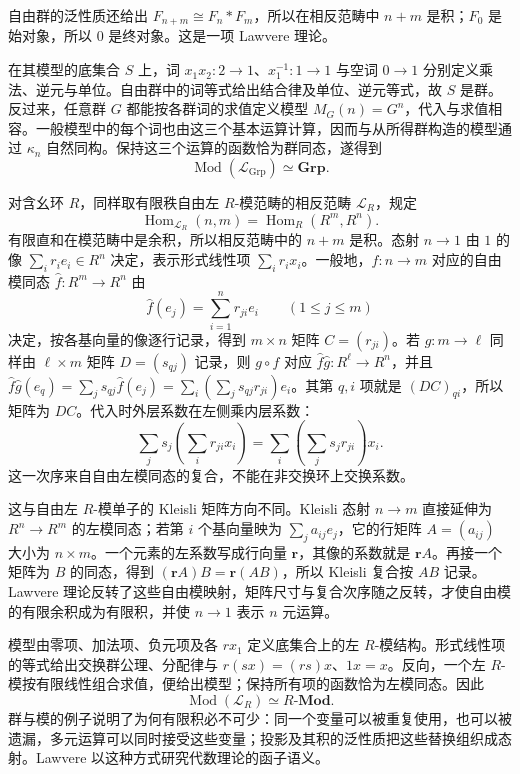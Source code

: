 \ProseParagraphBreak
自由群的泛性质还给出 \(F_{n+m}\cong F_n*F_m\)，所以在相反范畴中 \(n+m\) 是积；\(F_0\) 是始对象，所以 \(0\) 是终对象。这是一项 Lawvere 理论。

\ProseParagraphBreak
在其模型的底集合 \(S\) 上，词 \(x_1x_2:2\to1\)、\(x_1^{-1}:1\to1\) 与空词 \(0\to1\) 分别定义乘法、逆元与单位。自由群中的词等式给出结合律及单位、逆元等式，故 \(S\) 是群。反过来，任意群 \(G\) 都能按各群词的求值定义模型 \(M_G(n)=G^n\)，代入与求值相容。一般模型中的每个词也由这三个基本运算计算，因而与从所得群构造的模型通过 \(\kappa_n\) 自然同构。保持这三个运算的函数恰为群同态，遂得到
\[
	\operatorname{Mod}(\mathcal L_{\mathrm{Grp}})\simeq\mathbf{Grp}.
\]

对含幺环 \(R\)，同样取有限秩自由左 \(R\)-模范畴的相反范畴 \(\mathcal L_R\)，规定
\[
	\operatorname{Hom}_{\mathcal L_R}(n,m) =\operatorname{Hom}_R(R^m,R^n).
\]
有限直和在模范畴中是余积，所以相反范畴中的 \(n+m\) 是积。态射 \(n\rightarrow1\) 由 \(1\) 的像 \(\sum_i r_ie_i\in R^n\) 决定，表示形式线性项 \(\sum_i r_ix_i\)。一般地，\(f:n\rightarrow m\) 对应的自由模同态 \(\widehat f:R^m\rightarrow R^n\) 由
\[
	\widehat f(e_j)=\sum_{i=1}^n r_{ji}e_i \qquad(1\le j\le m)
\]
决定，按各基向量的像逐行记录，得到 \(m\times n\) 矩阵 \(C=(r_{ji})\)。若 \(g:m\rightarrow\ell\) 同样由 \(\ell\times m\) 矩阵 \(D=(s_{qj})\) 记录，则 \(g\circ f\) 对应 \(\widehat f\widehat g:R^\ell\to R^n\)，并且 \(\widehat f\widehat g(e_q)=\sum_j s_{qj}\widehat f(e_j)=\sum_i(\sum_js_{qj}r_{ji})e_i\)。其第 \(q,i\) 项就是 \((DC)_{qi}\)，所以矩阵为 \(DC\)。代入时外层系数在左侧乘内层系数：
\[
	\sum_j s_j\left(\sum_i r_{ji}x_i\right) =\sum_i\left(\sum_j s_jr_{ji}\right)x_i.
\]
这一次序来自自由左模同态的复合，不能在非交换环上交换系数。

\ProseParagraphBreak
这与自由左 \(R\)-模单子的 Kleisli 矩阵方向不同。Kleisli 态射 \(n\rightarrow m\) 直接延伸为 \(R^n\rightarrow R^m\) 的左模同态；若第 \(i\) 个基向量映为 \(\sum_j a_{ij}e_j\)，它的行矩阵 \(A=(a_{ij})\) 大小为 \(n\times m\)。一个元素的左系数写成行向量 \(\mathbf r\)，其像的系数就是 \(\mathbf rA\)。再接一个矩阵为 \(B\) 的同态，得到 \((\mathbf rA)B=\mathbf r(AB)\)，所以 Kleisli 复合按 \(AB\) 记录。Lawvere 理论反转了这些自由模映射，矩阵尺寸与复合次序随之反转，才使自由模的有限余积成为有限积，并使 \(n\rightarrow1\) 表示 \(n\) 元运算。

\ProseParagraphBreak
模型由零项、加法项、负元项及各 \(rx_1\) 定义底集合上的左 \(R\)-模结构。形式线性项的等式给出交换群公理、分配律与 \(r(sx)=(rs)x\)、\(1x=x\)。反向，一个左 \(R\)-模按有限线性组合求值，便给出模型；保持所有项的函数恰为左模同态。因此
\[
	\operatorname{Mod}(\mathcal L_R)\simeq R\text{-}\mathbf{Mod}.
\]
群与模的例子说明了为何有限积必不可少：同一个变量可以被重复使用，也可以被遗漏，多元运算可以同时接受这些变量；投影及其积的泛性质把这些替换组织成态射。Lawvere 以这种方式研究代数理论的函子语义\cite[pp. 869--870]{Lawvere1963FunctorialSemantics}。
